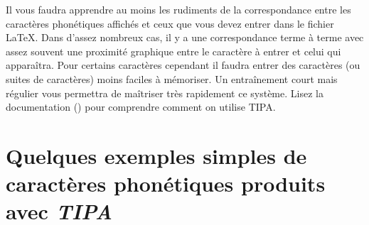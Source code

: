 Il vous faudra apprendre au moins les rudiments de la correspondance
entre les caractères phonétiques affichés et ceux que vous devez
entrer dans le fichier \LaTeX. Dans d'assez nombreux cas, il y a une
correspondance terme à terme avec assez souvent une proximité
graphique entre le caractère à entrer et celui qui apparaîtra. Pour
certains caractères cependant il faudra entrer des caractères (ou
suites de caractères) moins faciles à mémoriser. Un entraînement court
mais régulier vous permettra de maîtriser très rapidement ce
système. Lisez la documentation () pour comprendre
comment on utilise TIPA.



\section{Quelques exemples simples de caractères phonétiques produits avec \emph{TIPA}}


